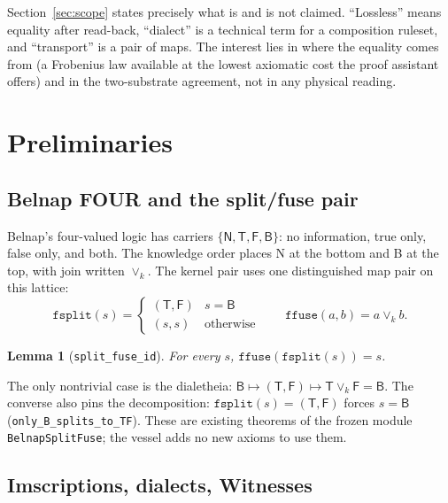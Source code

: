 \documentclass[12pt,a4paper]{article}
\newtheorem{lemma}[theorem]{Lemma}
\newcommand{\bN}{\textsf{N}}
\newcommand{\bT}{\textsf{T}}
\newcommand{\bF}{\textsf{F}}
\newcommand{\bB}{\textsf{B}}
\begin{document}
Section~\ref{sec:scope} states precisely what is and is not claimed.  ``Lossless''
means equality after read-back, ``dialect'' is a technical term for a composition
ruleset, and ``transport'' is a pair of maps.  The interest lies in where the
equality comes from (a Frobenius law available at the lowest axiomatic cost the
proof assistant offers) and in the two-substrate agreement, not in any physical
reading.

\section{Preliminaries}
\label{sec:prelim}

\subsection{Belnap FOUR and the split/fuse pair}

Belnap's four-valued logic \cite{Belnap1977} has carriers
$\{\bN, \bT, \bF, \bB\}$: no information, true only, false only, and both.
The knowledge order places \bN{} at the bottom and \bB{} at the top, with join
written $\vee_k$.  The kernel pair uses one distinguished map pair on this
lattice:
\[
\texttt{fsplit}(s) =
\begin{cases}
(\bT, \bF) & s = \bB\\
(s, s) & \text{otherwise}
\end{cases}
\qquad
\texttt{ffuse}(a, b) = a \vee_k b .
\]

\begin{lemma}[\texttt{split\_fuse\_id}]
For every $s$, $\texttt{ffuse}(\texttt{fsplit}(s)) = s$.
\end{lemma}

The only nontrivial case is the dialetheia:
$\bB \mapsto (\bT, \bF) \mapsto \bT \vee_k \bF = \bB$.  The converse also pins
the decomposition: $\texttt{fsplit}(s) = (\bT,\bF)$ forces $s = \bB$
(\texttt{only\_B\_splits\_to\_TF}).  These are existing theorems of the frozen
module \texttt{BelnapSplitFuse}; the vessel adds no new axioms to use them.

\subsection{Imscriptions, dialects, Witnesses}
\end{document}

